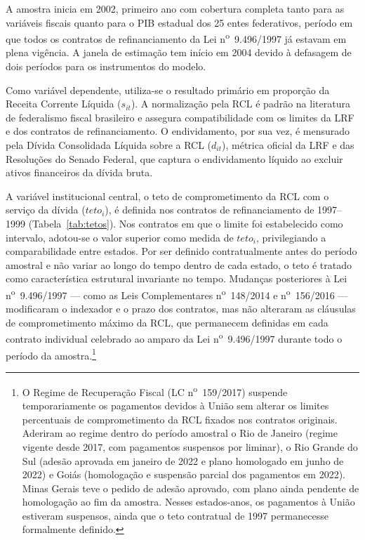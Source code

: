 A amostra inicia em 2002, primeiro ano com cobertura completa tanto para as variáveis fiscais quanto para o PIB estadual dos 25 entes federativos, período em que todos os contratos de refinanciamento da Lei n\textsuperscript{o}~9.496/1997 já estavam em plena vigência. A janela de estimação tem início em 2004 devido à defasagem de dois períodos para os instrumentos do modelo.

Como variável dependente, utiliza-se o resultado primário em proporção da Receita Corrente Líquida ($s_{it}$). A normalização pela RCL é padrão na literatura de federalismo fiscal brasileiro e assegura compatibilidade com os limites da LRF e dos contratos de refinanciamento. O endividamento, por sua vez, é mensurado pela Dívida Consolidada Líquida sobre a RCL ($d_{it}$), métrica oficial da LRF e das Resoluções do Senado Federal, que captura o endividamento líquido ao excluir ativos financeiros da dívida bruta.

A variável institucional central, o teto de comprometimento da RCL com o serviço da dívida ($teto_i$), é definida nos contratos de refinanciamento de 1997--1999 (Tabela~\ref{tab:tetos}). Nos contratos em que o limite foi estabelecido como intervalo, adotou-se o valor superior como medida de $teto_i$, privilegiando a comparabilidade entre estados. Por ser definido contratualmente antes do período amostral e não variar ao longo do tempo dentro de cada estado, o teto é tratado como característica estrutural invariante no tempo. Mudanças posteriores à Lei n\textsuperscript{o}~9.496/1997 --- como as Leis Complementares n\textsuperscript{o}~148/2014 e n\textsuperscript{o}~156/2016 --- modificaram o indexador e o prazo dos contratos, mas não alteraram as cláusulas de comprometimento máximo da RCL, que permanecem definidas em cada contrato individual celebrado ao amparo da Lei n\textsuperscript{o}~9.496/1997 durante todo o período da amostra.\footnote{O Regime de Recuperação Fiscal (LC n\textsuperscript{o}~159/2017) suspende temporariamente os pagamentos devidos à União sem alterar os limites percentuais de comprometimento da RCL fixados nos contratos originais. Aderiram ao regime dentro do período amostral o Rio de Janeiro (regime vigente desde 2017, com pagamentos suspensos por liminar), o Rio Grande do Sul (adesão aprovada em janeiro de 2022 e plano homologado em junho de 2022) e Goiás (homologação e suspensão parcial dos pagamentos em 2022). Minas Gerais teve o pedido de adesão aprovado, com plano ainda pendente de homologação ao fim da amostra. Nesses estados-anos, os pagamentos à União estiveram suspensos, ainda que o teto contratual de 1997 permanecesse formalmente definido.}

